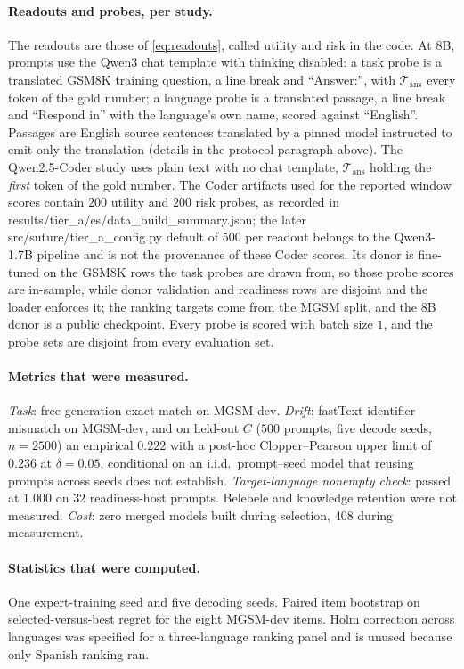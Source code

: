 \documentclass{article}
\newcommand{\artifact}[1]{\textsf{#1}}
\theoremstyle{plain}
\theoremstyle{definition}
\theoremstyle{remark}
\begin{document}
\paragraph{Readouts and probes, per study.}
The readouts are those of \eqref{eq:readouts}, called \artifact{utility} and
\artifact{risk} in the code. At 8B, prompts use the Qwen3 chat template with
thinking disabled: a task probe is a translated GSM8K training question, a line
break and ``Answer:'', with $\mathcal{T}_{\mathrm{ans}}$ every token of the gold
number; a language probe is a translated passage, a line break and ``Respond
in'' with the language's own name, scored against ``English''. Passages are
English source sentences translated by a pinned model instructed to emit only
the translation (details in the protocol paragraph above). The Qwen2.5-Coder study uses
plain text with no chat template, $\mathcal{T}_{\mathrm{ans}}$ holding the
\emph{first} token of the gold number.
The Coder artifacts used for the reported window scores contain $200$ utility
and $200$ risk probes, as recorded in
\artifact{results/tier\_a/es/data\_build\_summary.json};
the later \artifact{src/suture/tier\_a\_config.py} default of $500$ per readout belongs to
the Qwen3-1.7B pipeline and is not the provenance of these Coder scores.
Its donor is fine-tuned on the GSM8K rows the task probes are drawn from, so
those probe scores are in-sample, while donor validation and readiness rows are
disjoint and the loader enforces it; the ranking targets come from the MGSM
split, and the 8B donor is a public checkpoint. Every probe is scored with batch
size $1$, and the probe sets are disjoint from every evaluation set.

\paragraph{Metrics that were measured.}
\emph{Task}: free-generation exact match on MGSM-dev. \emph{Drift}: fastText
identifier \citep{grave2018fasttext} mismatch on MGSM-dev, and on held-out $C$
($500$ prompts, five decode seeds, $n=2500$) an empirical $0.222$ with a post-hoc
Clopper--Pearson \citep{clopper1934} upper limit of $0.236$ at $\delta=0.05$,
conditional on an i.i.d.\ prompt--seed model that reusing prompts across seeds
does not establish. \emph{Target-language nonempty check}: passed at $1.000$ on
$32$ readiness-host prompts. Belebele and knowledge retention were not measured.
\emph{Cost}: zero merged models built during selection, $408$ during
measurement.

\paragraph{Statistics that were computed.} One expert-training seed and five
decoding seeds. Paired item bootstrap on selected-versus-best regret for the
eight MGSM-dev items. Holm correction across languages was specified for a
three-language ranking panel and is unused because only Spanish ranking ran.
\end{document}
